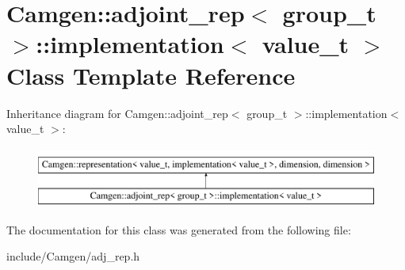 \hypertarget{a00281}{\section{Camgen\-:\-:adjoint\-\_\-rep$<$ group\-\_\-t $>$\-:\-:implementation$<$ value\-\_\-t $>$ Class Template Reference}
\label{a00281}
}
Inheritance diagram for Camgen\-:\-:adjoint\-\_\-rep$<$ group\-\_\-t $>$\-:\-:implementation$<$ value\-\_\-t $>$\-:\begin{figure}[H]
\begin{center}
\leavevmode
\includegraphics[height=2.000000cm]{a00281}
\end{center}
\end{figure}


The documentation for this class was generated from the following file\-:\begin{DoxyCompactItemize}
\item 
include/\-Camgen/adj\-\_\-rep.\-h\end{DoxyCompactItemize}
